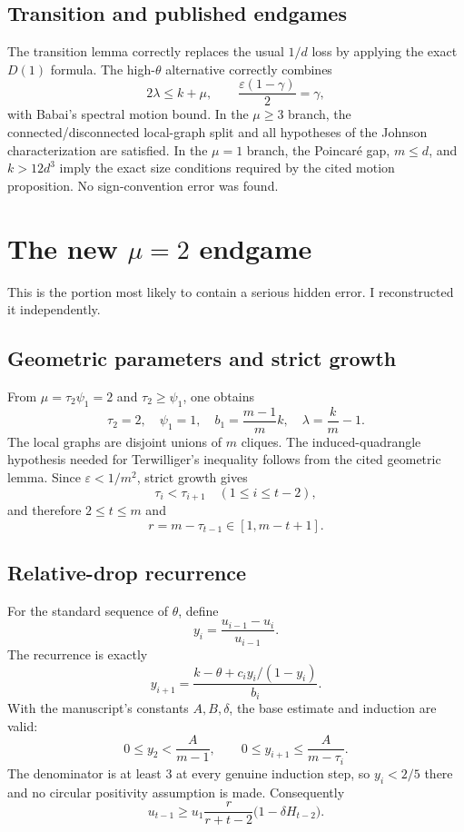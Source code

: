 \documentclass[11pt]{article}
\newcommand{\eps}{\varepsilon}
\newcommand{\gam}{\gamma}
\begin{document}
\subsection{Transition and published endgames}
The transition lemma correctly replaces the usual $1/d$ loss by applying the exact $D(1)$ formula.  The high-$\theta$ alternative correctly combines
\[
 2\lambda\le k+\mu,
 \qquad
 \frac{\eps(1-\gam)}2=\gam,
\]
with Babai's spectral motion bound.  In the $\mu\ge3$ branch, the connected/disconnected local-graph split and all hypotheses of the Johnson characterization are satisfied.  In the $\mu=1$ branch, the Poincar\'e gap, $m\le d$, and $k>12d^3$ imply the exact size conditions required by the cited motion proposition.  No sign-convention error was found.

\section{The new $\mu=2$ endgame}
This is the portion most likely to contain a serious hidden error.  I reconstructed it independently.

\subsection{Geometric parameters and strict growth}
From $\mu=\tau_2\psi_1=2$ and $\tau_2\ge\psi_1$, one obtains
\[
 \tau_2=2,\quad\psi_1=1,\quad
 b_1=\frac{m-1}{m}k,\quad \lambda=\frac{k}{m}-1.
\]
The local graphs are disjoint unions of $m$ cliques.  The induced-quadrangle hypothesis needed for Terwilliger's inequality follows from the cited geometric lemma.  Since $\eps<1/m^2$, strict growth gives
\[
 \tau_i<\tau_{i+1}\quad(1\le i\le t-2),
\]
and therefore $2\le t\le m$ and
\[
 r=m-\tau_{t-1}\in[1,m-t+1].
\]

\subsection{Relative-drop recurrence}
For the standard sequence of $\theta$, define
\[
 y_i=\frac{u_{i-1}-u_i}{u_{i-1}}.
\]
The recurrence is exactly
\[
 y_{i+1}
 =\frac{k-\theta+c_i y_i/(1-y_i)}{b_i}.
\]
With the manuscript's constants $A,B,\delta$, the base estimate and induction are valid:
\[
 0\le y_2<\frac{A}{m-1},
 \qquad
 0\le y_{i+1}\le\frac{A}{m-\tau_i}.
\]
The denominator is at least $3$ at every genuine induction step, so $y_i<2/5$ there and no circular positivity assumption is made.  Consequently
\[
 u_{t-1}\ge u_1\frac{r}{r+t-2}
 \bigl(1-\delta H_{t-2}\bigr).
\]
\end{document}
